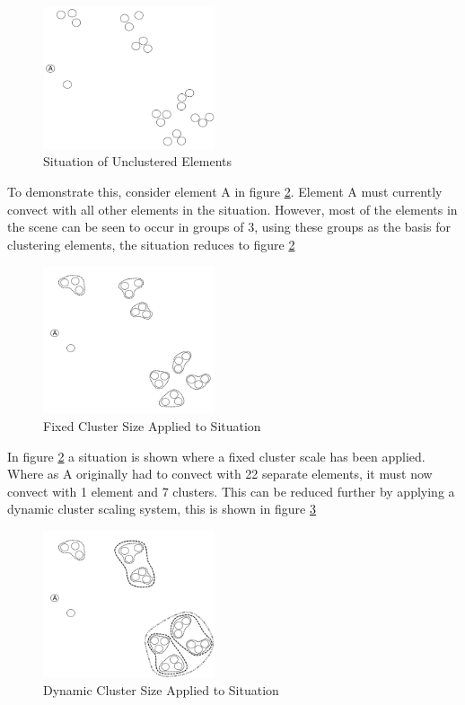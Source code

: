 \begin{figure}[H]
\centering
\includegraphics[width=0.45\textwidth]{Figures/LargeSeriesElement.png}
\caption{\label{fig:UnDynClust}Situation of Unclustered Elements}
\end{figure}

To demonstrate this, consider element A in figure \ref{fig:UnDynClust}. Element A must currently convect with all other elements in the situation. However, most of the elements in the scene can be seen to occur in groups of 3, using these groups as the basis for clustering elements, the situation reduces to figure \ref{fig:UnDynClust} 

\begin{figure}[H]
\centering
\includegraphics[width=0.45\textwidth]{Figures/LargeSeriesElementFirstCluster.png}
\caption{\label{fig:UnDynClust}Fixed Cluster Size Applied to Situation}
\end{figure}

In figure \ref{fig:UnDynClust} a situation is shown where a fixed cluster scale has been applied. Where as A originally had to convect with 22 separate elements, it must now convect with 1 element and 7 clusters. This can be reduced further by applying a dynamic cluster scaling system, this is shown in figure \ref{fig:DynClust}

\begin{figure}[H]
\centering
\includegraphics[width=0.45\textwidth]{Figures/LargeSeriesElementSecondCluster.png}
\caption{\label{fig:DynClust}Dynamic Cluster Size Applied to Situation}
\end{figure}

